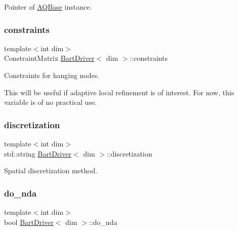 Pointer of \hyperlink{class_a_q_base}{A\+Q\+Base} instance. 

\mbox{\label{class_bart_driver_a2414c8e66212bb95c86f1c70db4a4099}} 
\subsubsection{\texorpdfstring{constraints}{constraints}}
{\footnotesize\ttfamily template$<$int dim$>$ \\
Constraint\+Matrix \hyperlink{class_bart_driver}{Bart\+Driver}$<$ dim $>$\+::constraints\hspace{0.3cm}{\ttfamily [private]}}



Constraints for hanging nodes. 

This will be useful if adaptive local refinement is of interest. For now, this variable is of no practical use. \mbox{\label{class_bart_driver_a75cc884c6895beca3d3861ca226b4a3f}} 
\subsubsection{\texorpdfstring{discretization}{discretization}}
{\footnotesize\ttfamily template$<$int dim$>$ \\
std\+::string \hyperlink{class_bart_driver}{Bart\+Driver}$<$ dim $>$\+::discretization\hspace{0.3cm}{\ttfamily [private]}}



Spatial discretization method. 

\mbox{\label{class_bart_driver_acb7aa4c65a18deef5e1be7a3477d1b12}} 
\subsubsection{\texorpdfstring{do\+\_\+nda}{do\_nda}}
{\footnotesize\ttfamily template$<$int dim$>$ \\
bool \hyperlink{class_bart_driver}{Bart\+Driver}$<$ dim $>$\+::do\+\_\+nda\hspace{0.3cm}{\ttfamily [private]}}



